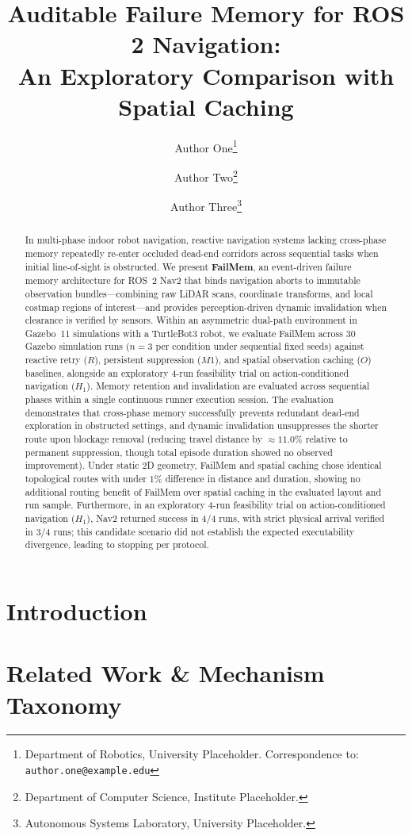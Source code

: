 \documentclass[10pt,twocolumn]{article}
\title{Auditable Failure Memory for ROS 2 Navigation:\\An Exploratory Comparison with Spatial Caching}
\author{
    Author One\thanks{Department of Robotics, University Placeholder. Correspondence to: \texttt{author.one@example.edu}}
    \and
    Author Two\thanks{Department of Computer Science, Institute Placeholder.}
    \and
    Author Three\thanks{Autonomous Systems Laboratory, University Placeholder.}
}
\date{}
\begin{document}
\maketitle

\begin{abstract}
In multi-phase indoor robot navigation, reactive navigation systems lacking cross-phase memory repeatedly re-enter occluded dead-end corridors across sequential tasks when initial line-of-sight is obstructed. We present \textbf{FailMem}, an event-driven failure memory architecture for ROS~2 Nav2 that binds navigation aborts to immutable observation bundles---combining raw LiDAR scans, coordinate transforms, and local costmap regions of interest---and provides perception-driven dynamic invalidation when clearance is verified by sensors. Within an asymmetric dual-path environment in Gazebo~11 simulations with a TurtleBot3 robot, we evaluate FailMem across 30 Gazebo simulation runs ($n=3$ per condition under sequential fixed seeds) against reactive retry ($R$), persistent suppression ($M1$), and spatial observation caching ($O$) baselines, alongside an exploratory 4-run feasibility trial on action-conditioned navigation ($H_1$). Memory retention and invalidation are evaluated across sequential phases within a single continuous runner execution session. The evaluation demonstrates that cross-phase memory successfully prevents redundant dead-end exploration in obstructed settings, and dynamic invalidation unsuppresses the shorter route upon blockage removal (reducing travel distance by $\approx 11.0\%$ relative to permanent suppression, though total episode duration showed no observed improvement). Under static 2D geometry, FailMem and spatial caching chose identical topological routes with under $1\%$ difference in distance and duration, showing no additional routing benefit of FailMem over spatial caching in the evaluated layout and run sample. Furthermore, in an exploratory 4-run feasibility trial on action-conditioned navigation ($H_1$), Nav2 returned success in 4/4 runs, with strict physical arrival verified in 3/4 runs; this candidate scenario did not establish the expected executability divergence, leading to stopping per protocol.
\end{abstract}

\section{Introduction}


\section{Related Work \& Mechanism Taxonomy}

\end{document}
